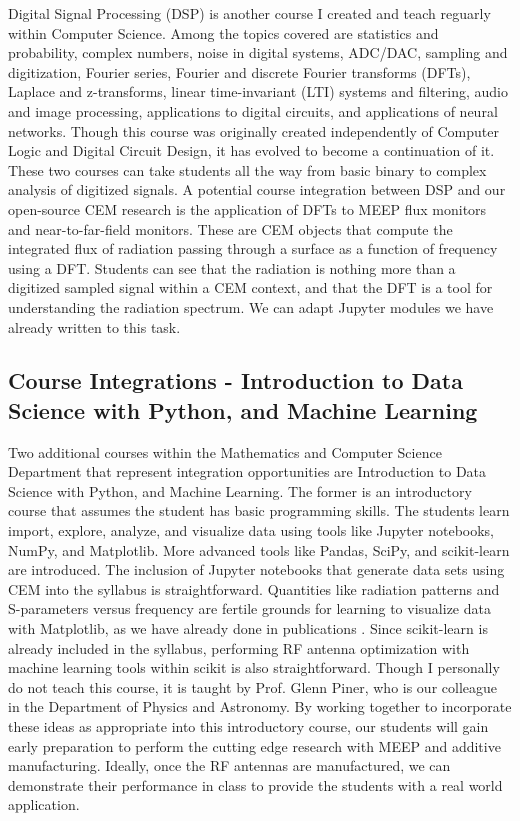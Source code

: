 \documentclass[../../main.tex]{subfiles}
\begin{document}
Digital Signal Processing (DSP) is another course I created and teach reguarly within Computer Science.  Among the topics covered are statistics and probability, complex numbers, noise in digital systems, ADC/DAC, sampling and digitization, Fourier series, Fourier and discrete Fourier transforms (DFTs), Laplace and z-transforms, linear time-invariant (LTI) systems and filtering, audio and image processing, applications to digital circuits, and applications of neural networks.  Though this course was originally created independently of Computer Logic and Digital Circuit Design, it has evolved to become a continuation of it.  These two courses can take students all the way from basic binary to complex analysis of digitized signals.  A potential course integration between DSP and our open-source CEM research is the application of DFTs to MEEP flux monitors and near-to-far-field monitors.  These are CEM objects that compute the integrated flux of radiation passing through a surface as a function of frequency using a DFT.  Students can see that the radiation is nothing more than a digitized sampled signal within a CEM context, and that the DFT is a tool for understanding the radiation spectrum.  We can adapt Jupyter modules we have already written to this task. \\ \vspace{2.5mm}

\subsection{Course Integrations - Introduction to Data Science with Python, and Machine Learning}

Two additional courses within the Mathematics and Computer Science Department that represent integration opportunities are Introduction to Data Science with Python, and Machine Learning.  The former is an introductory course that assumes the student has basic programming skills.  The students learn import, explore, analyze, and visualize data using tools like Jupyter notebooks, NumPy, and Matplotlib.  More advanced tools like Pandas, SciPy, and scikit-learn are introduced.  The inclusion of Jupyter notebooks that generate data sets using CEM into the syllabus is straightforward.  Quantities like radiation patterns and S-parameters versus frequency are fertile grounds for learning to visualize data with Matplotlib, as we have already done in publications \cite{electronics10040415}.  Since scikit-learn is already included in the syllabus, performing RF antenna optimization with machine learning tools within scikit is also straightforward.  Though I personally do not teach this course, it is taught by Prof. Glenn Piner, who is our colleague in the Department of Physics and Astronomy.  By working together to incorporate these ideas as appropriate into this introductory course, our students will gain early preparation to perform the cutting edge research with MEEP and additive manufacturing.  Ideally, once the RF antennas are manufactured, we can demonstrate their performance in class to provide the students with a real world application. \\ \vspace{2.5mm}
\end{document}
